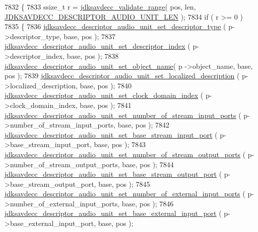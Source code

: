 \begin{DoxyCode}
7832 \{
7833     ssize\_t r = \hyperlink{group__util_ga9c02bdfe76c69163647c3196db7a73a1}{jdksavdecc\_validate\_range}( pos, len, 
      \hyperlink{group__descriptor__audio_ga9dc3459aa940c794fe03d7a04c3319c4}{JDKSAVDECC\_DESCRIPTOR\_AUDIO\_UNIT\_LEN} );
7834     \textcolor{keywordflow}{if} ( r >= 0 )
7835     \{
7836         \hyperlink{group__descriptor__audio_ga134984b598380da96c445773b0c39019}{jdksavdecc\_descriptor\_audio\_unit\_set\_descriptor\_type}
      ( p->descriptor\_type, base, pos );
7837         \hyperlink{group__descriptor__audio_ga5a7f323e9bf127c012a9d364ac6aac7b}{jdksavdecc\_descriptor\_audio\_unit\_set\_descriptor\_index}
      ( p->descriptor\_index, base, pos );
7838         \hyperlink{group__descriptor__audio_gac43ee79ece4d4189fe20bc595152aa0a}{jdksavdecc\_descriptor\_audio\_unit\_set\_object\_name}( p
      ->object\_name, base, pos );
7839         \hyperlink{group__descriptor__audio_ga4b5dae705b5360c134eaf2214fdb27d9}{jdksavdecc\_descriptor\_audio\_unit\_set\_localized\_description}
      ( p->localized\_description, base, pos );
7840         \hyperlink{group__descriptor__audio_ga5cf215cfc1ba6a33e07ca772af5354dd}{jdksavdecc\_descriptor\_audio\_unit\_set\_clock\_domain\_index}
      ( p->clock\_domain\_index, base, pos );
7841         \hyperlink{group__descriptor__audio_ga700f9764294f4e5ae874e4d57b1800f3}{jdksavdecc\_descriptor\_audio\_unit\_set\_number\_of\_stream\_input\_ports}
      ( p->number\_of\_stream\_input\_ports, base, pos );
7842         \hyperlink{group__descriptor__audio_ga1299bb147733b4ab4ec47dc6e5ba44fa}{jdksavdecc\_descriptor\_audio\_unit\_set\_base\_stream\_input\_port}
      ( p->base\_stream\_input\_port, base, pos );
7843         \hyperlink{group__descriptor__audio_gab1bce5de282622b7c299822b441e1c04}{jdksavdecc\_descriptor\_audio\_unit\_set\_number\_of\_stream\_output\_ports}
      ( p->number\_of\_stream\_output\_ports, base, pos );
7844         \hyperlink{group__descriptor__audio_ga3eec511458ece52356d75d158f239fab}{jdksavdecc\_descriptor\_audio\_unit\_set\_base\_stream\_output\_port}
      ( p->base\_stream\_output\_port, base, pos );
7845         \hyperlink{group__descriptor__audio_ga9ffbf27d33e75a2ccf92bae1d505335e}{jdksavdecc\_descriptor\_audio\_unit\_set\_number\_of\_external\_input\_ports}
      ( p->number\_of\_external\_input\_ports, base, pos );
7846         \hyperlink{group__descriptor__audio_ga6805ff2e94192884b3f7398701f85db2}{jdksavdecc\_descriptor\_audio\_unit\_set\_base\_external\_input\_port}
      ( p->base\_external\_input\_port, base, pos );

\end{DoxyCode}
